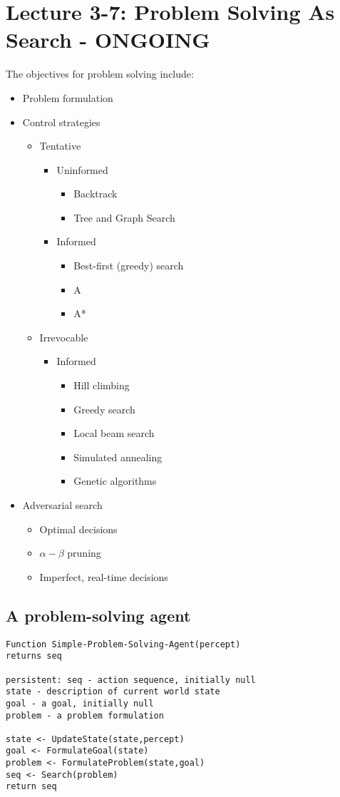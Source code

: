 \documentclass[11pt, oneside]{article}   	%
\begin{document}
\section{Lecture 3-7: Problem Solving As Search - ONGOING}

The objectives for problem solving include:
\begin{itemize}
\item Problem formulation
\item Control strategies
\begin{itemize}
\item Tentative
\begin{itemize}
\item Uninformed
\begin{itemize}
\item Backtrack
\item Tree and Graph Search
\end{itemize}
\item Informed
\begin{itemize}
\item Best-first (greedy) search
\item A
\item A*
\end{itemize}
\end{itemize}
\item Irrevocable
\begin{itemize}
\item Informed
\begin{itemize}
\item Hill climbing
\item Greedy search
\item Local beam search
\item Simulated annealing
\item Genetic algorithms
\end{itemize}
\end{itemize}

\end{itemize}
\item Adversarial search
\begin{itemize}
\item Optimal decisions
\item $\alpha - \beta$ pruning
\item Imperfect, real-time decisions
\end{itemize}
\end{itemize}
\subsection{A problem-solving agent}
\begin{verbatim}
Function Simple-Problem-Solving-Agent(percept) 
returns seq

persistent: seq - action sequence, initially null 
state - description of current world state
goal - a goal, initially null
problem - a problem formulation 

state <- UpdateState(state,percept)
goal <- FormulateGoal(state)
problem <- FormulateProblem(state,goal) 
seq <- Search(problem)
return seq
\end{verbatim}
\end{document}

